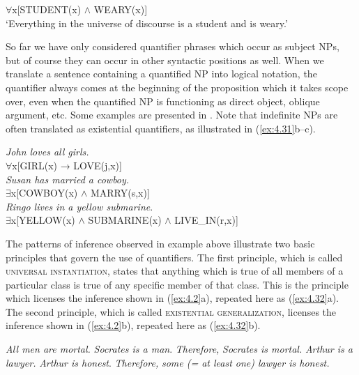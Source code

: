 \ea \label{ex:4.30}
${\forall}$x[STUDENT(x) $\wedge$ WEARY(x)]\\
‘Everything in the universe of discourse is a student and is weary.’
\z


So far we have only considered quantifier phrases which occur as subject NPs, but of course they can occur in other syntactic positions as well. When we translate a sentence containing a quantified NP into logical notation, the quantifier always comes at the beginning of the proposition which it takes scope over, even when the quantified NP is functioning as direct object, oblique argument, etc. Some examples are presented in . Note that indefinite NPs are often translated as existential quantifiers, as illustrated in (\ref{ex:4.31}b--c).


\ea \label{ex:4.31}
\ea \textit{John loves all girls.}\\
  ${\forall}$x[GIRL(x) → LOVE(j,x)]\\
\ex \textit{Susan has married a cowboy.}\\
  ${\exists}$x[COWBOY(x) $\wedge$ MARRY(s,x)]\\
\ex \textit{Ringo lives in a yellow submarine}.\\
  ${\exists}$x[YELLOW(x) $\wedge$ SUBMARINE(x) ${\wedge}$ LIVE\_IN(r,x)]
                       \z
\z


The patterns of inference observed in example  above illustrate two basic principles that govern the use of quantifiers. The first principle, which is called \textsc{universal instantiation}, states that anything which is true of all members of a particular class is true of any specific member of that class. This is the principle which licenses the inference shown in (\ref{ex:4.2}a), repeated here as (\ref{ex:4.32}a). The second principle, which is called \textsc{existential generalization}, licenses the inference shown in (\ref{ex:4.2}b), repeated here as (\ref{ex:4.32}b).

\settowidth\jamwidth{${\forall}$x[MAN(x) → MORTAL(x)}
\ea \label{ex:4.32}
\ea  \textit{All men are mortal.}  
\textit{Socrates is a man}.        
\FelixHRule
\textit{Therefore,} \textit{Socrates is mortal.}  
\ex   \textit{Arthur is a lawyer.}                
\textit{Arthur is honest}.                        
\FelixHRule
\textit{Therefore,} \textit{some (= at least one) lawyer is honest.}  \jambox{${\exists}$x[LAWYER(x) $\wedge$ HONEST(x)}
\z \z

